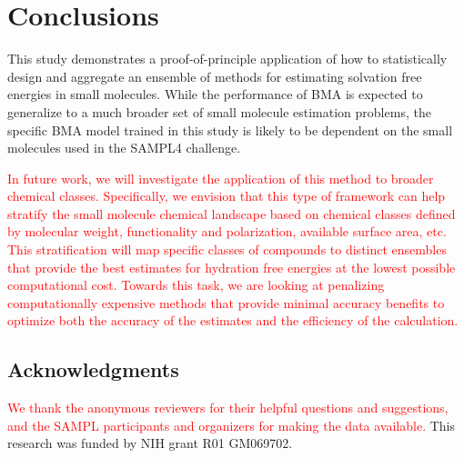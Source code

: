 \documentclass[journal=jpcbfk, manuscript=article]{achemso}
\newcommand{\+}[1]{\ensuremath{\mathbf{#1}}}
\newcommand{\rev}[1]{\textsf{\textcolor{red}{#1}}}
\begin{document}
\section{Conclusions}
This study demonstrates a proof-of-principle application of how to statistically design and aggregate an ensemble of methods for estimating solvation free energies in small molecules.
While the performance of BMA is expected to generalize to a much broader set of small molecule estimation problems, the specific BMA model trained in this study is likely to be dependent on the small molecules used in the SAMPL4 challenge.

\rev{In future work, we will investigate the application of this method to broader chemical classes.
Specifically, we envision that this type of framework can help stratify the small molecule chemical landscape based on chemical classes defined by molecular weight, functionality and polarization, available surface area, etc.
This stratification will map specific classes of compounds to distinct ensembles that provide the best estimates for hydration free energies at the lowest possible computational cost.
Towards this task, we are looking at penalizing computationally expensive methods that provide minimal accuracy benefits to optimize both the accuracy of the estimates and the efficiency of the calculation.}

\subsection*{Acknowledgments}
\rev{We thank the anonymous reviewers for their helpful questions and suggestions, and the SAMPL participants and organizers for making the data available.} 
This research was funded by NIH grant R01 GM069702.


\end{document}
